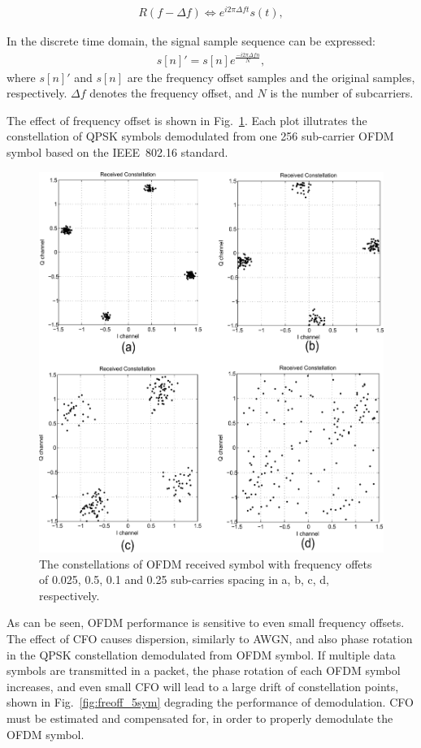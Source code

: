 \begin{eqnarray}
\label{equ:}
             R(f - \Delta f) \Leftrightarrow  e^{i2\pi \Delta ft} s(t),
\end{eqnarray}	

In the discrete time domain, the signal sample sequence can be expressed: 
\begin{eqnarray}
\label{equ:}
            s[n]' = s[n] e^{\frac{− i2\pi \Delta fn}{N}},
\end{eqnarray}
where $s[n]'$ and $s[n]$ are the frequency offset samples and the original samples, respectively.
$\Delta f$ denotes the frequency offset, and $N$ is the number of subcarriers. 

The effect of frequency offset is shown in Fig.~\ref{fig:freoff_1sym}. Each plot illutrates the constellation of QPSK symbols demodulated from one 256 sub-carrier OFDM symbol based on the IEEE~802.16 standard.

\begin{figure}
	\centerline{\includegraphics [width=0.8\columnwidth] {Figures/freoff_1sym.pdf} }
	\caption{The constellations of OFDM received symbol with frequency offets of 0.025, 0.5, 0.1 and 0.25 sub-carries spacing in a, b, c, d, respectively.}
	\label{fig:freoff_1sym}
\end{figure}

As can be seen, OFDM performance is sensitive to even small frequency offsets. 
The effect of CFO causes dispersion, similarly to AWGN, and also phase rotation in the QPSK constellation demodulated from OFDM symbol.
If multiple data symbols are transmitted in a packet, the phase rotation of each OFDM symbol increases, and even small CFO will lead to a large drift of constellation points, shown in Fig.~\ref{fig:freoff_5sym} degrading the performance of demodulation. CFO must be estimated and compensated for, in order to properly demodulate the OFDM symbol.

